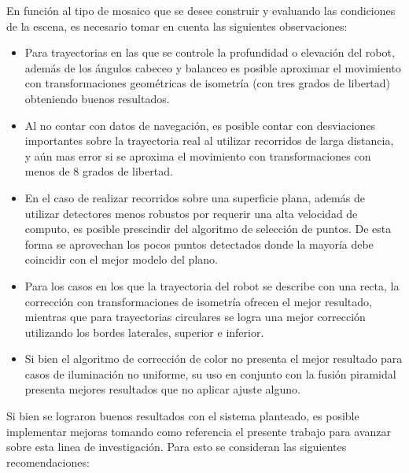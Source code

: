 En función al tipo de mosaico que se desee construir y evaluando las condiciones de la escena, es necesario tomar en cuenta las siguientes observaciones:

\begin{itemize}
	\item Para trayectorias en las que se controle la profundidad o elevación del robot, además de los ángulos cabeceo y balanceo es posible aproximar el movimiento con transformaciones geométricas de isometría (con tres grados de libertad) obteniendo buenos resultados.
	
	\item Al no contar con datos de navegación, es posible contar con desviaciones importantes sobre la trayectoria real al utilizar recorridos de larga distancia, y aún mas error si se aproxima el movimiento con transformaciones con menos de 8 grados de libertad.
	
	\item En el caso de realizar recorridos sobre una superficie plana, además de utilizar detectores menos robustos por requerir una alta velocidad de computo, es posible prescindir del algoritmo de selección de puntos. De esta forma se aprovechan los pocos puntos detectados donde la mayoría debe coincidir con el mejor modelo del plano.
	
	\item Para los casos en los que la trayectoria del robot se describe con una recta, la corrección con transformaciones de isometría ofrecen el mejor resultado, mientras que para trayectorias circulares se logra una mejor corrección utilizando los bordes laterales, superior e inferior.
	
	\item Si bien el algoritmo de corrección de color no presenta el mejor resultado para casos de iluminación no uniforme, su uso en conjunto con la fusión piramidal presenta mejores resultados que no aplicar ajuste alguno.
\end{itemize}

Si bien se lograron buenos resultados con el sistema planteado, es posible implementar mejoras tomando como referencia el presente trabajo para avanzar sobre esta linea de investigación. Para esto se consideran las siguientes recomendaciones:

